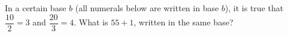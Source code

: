 In a certain base $b$ (all numerals below are written in base $b$), it is true that $\dfrac{10}{2}=3$ and $\dfrac{20}{3}=4$. What is $55+1$, written in the same base?
